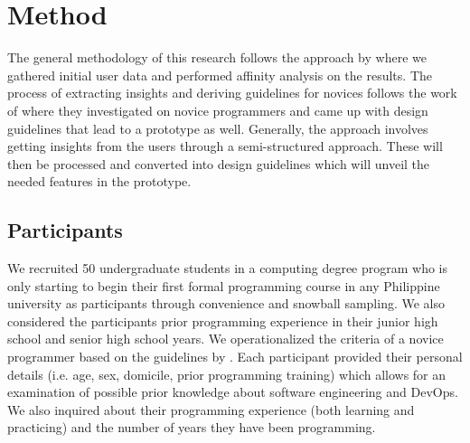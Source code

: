\documentclass{sigchi}
\begin{document}

\section{Method}
The general methodology of this research follows the approach by \cite{peffers2007design} where we gathered initial user data and performed affinity analysis on the results. The process of extracting insights and deriving guidelines for novices follows the work of \cite{beyer1999contextual, holtzblatt2005rapid, good2017programming} where they investigated on novice programmers and came up with design guidelines that lead to a prototype as well. Generally, the approach involves getting insights from the users through a semi-structured approach. These will then be processed and converted into design guidelines which will unveil the needed features in the prototype. 
\subsection{Participants}
We recruited 50 undergraduate students in a computing degree program who is only starting to begin their first formal programming course in any Philippine university as participants through convenience and snowball sampling. We also considered the participants prior programming experience in their junior high school and senior high school years. We operationalized the criteria of a novice programmer based on the guidelines by \cite{teague2014longitudinal}. Each participant provided their personal details (i.e. age, sex, domicile, prior programming training) which allows for an examination of possible prior knowledge about software engineering and DevOps. We also inquired about their programming experience (both learning and practicing) and the number of years they have been programming. 
\end{document}

